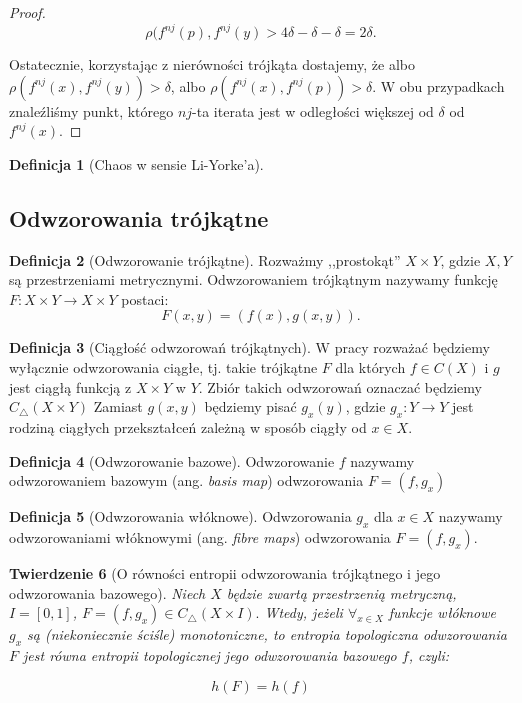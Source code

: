 \documentclass[licencjacka]{pwr_wmat_praca_dyplomowa}
\theoremstyle{plain}
\newtheorem{theorem}{Twierdzenie}
\numberwithin{theorem}{chapter}
\theoremstyle{definition}
\numberwithin{theorem}{chapter}
\newtheorem{definition}[theorem]{Definicja}
\begin{document}
\begin{proof}
$$\rho(f^{nj}(p), f^{nj}(y) > 4\delta - \delta - \delta = 2\delta.$$

Ostatecznie, korzystając z nierówności trójkąta dostajemy, że albo $\rho(f^{nj}(x), f^{nj}(y)) > \delta$, albo $\rho(f^{nj}(x), f^{nj}(p)) > \delta.$ W obu przypadkach znaleźliśmy punkt, którego $nj$-ta iterata jest w odległości większej od $\delta$ od $f^{nj}(x).$
\end{proof}



\begin{definition}[Chaos w sensie Li-Yorke'a]
\end{definition}



\subsection{Odwzorowania trójkątne}


\begin{definition}[Odwzorowanie trójkątne]
Rozważmy ,,prostokąt'' $X \times Y$, gdzie $X, Y$ są przestrzeniami metrycznymi. 
Odwzorowaniem trójkątnym nazywamy funkcję $F: X \times Y \rightarrow X \times Y$ postaci:
$$F(x,y) = (f(x), g(x,y)).$$
\end{definition}


\begin{definition}[Ciągłość odwzorowań trójkątnych]
W pracy rozważać będziemy wyłącznie odwzorowania ciągłe, tj. takie trójkątne $F$ dla których $f \in C(X)$ i $g$ jest ciągłą funkcją z $X \times Y$ w $Y$. 
Zbiór takich odwzorowań oznaczać będziemy $C_\triangle(X \times Y)$
Zamiast $g(x, y)$ będziemy pisać $g_x(y)$, gdzie $g_x: Y \rightarrow Y$ jest rodziną ciągłych przekształceń zależną w sposób ciągły od $x \in X$.
\end{definition}


\begin{definition}[Odwzorowanie bazowe]
Odwzorowanie $f$ nazywamy odwzorowaniem bazowym (ang. \textit{basis map}) odwzorowania $F = (f, g_x)$
\end{definition}

\begin{definition}[Odwzorowania włóknowe]
Odwzorowania $g_x$ dla $x \in X$ nazywamy odwzorowaniami włóknowymi (ang. \textit{fibre maps}) odwzorowania $F = (f, g_x)$.
\end{definition}


\begin{theorem}[O równości entropii odwzorowania trójkątnego i jego odwzorowania bazowego]
\label{rownosc_entropii_gdy_wlokna_monotoniczne}
Niech $X$ będzie zwartą przestrzenią metryczną, $I = [0, 1]$, $F = (f, g_x) \in C_\triangle(X \times I).$ Wtedy, jeżeli $\forall_{x \in X}$ funkcje włóknowe $g_x$ są (niekoniecznie ściśle) monotoniczne, to entropia topologiczna odwzorowania $F$ jest równa entropii topologicznej jego odwzorowania bazowego $f$, czyli:

$$h(F) = h(f)$$
\end{theorem}
\end{document}
